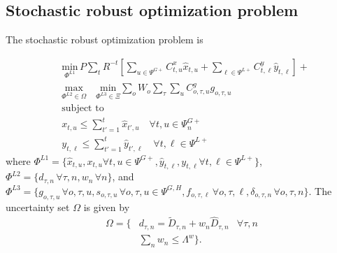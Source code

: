 \documentclass[final]{IEEEtran}
\begin{document}
\subsection{Stochastic robust optimization problem}

The stochastic robust optimization problem is

\begin{align}
&\label{saro_obj} \underset{\Phi^{L1}}{\text{min}} \, P \sum\limits_{t} R^{-t} \left[ \sum\limits_{u \in \Psi^{G+}} C^x_{t, u} \hat{x}_{t, u} + \sum\limits_{\ell \in \Psi^{L+}} C^y_{t, \ell} \hat{y}_{t, \ell} \right] +  \\
&\underset{\Phi^{L2} \in \Omega}{\text{max}} \quad \underset{\Phi^{L3} \in \Xi}{\text{min}} \sum\limits_o W_o \sum\limits_{\tau} \sum\limits_{u} C^g_{o, \tau, u} g_{o, \tau, u} \\
&\text{subject to} \nonumber \\
&\label{master_constraint_first} x_{t, u} \leq \sum\limits_{t' = 1}^{t} \hat{x}_{t', u} 	\quad \forall t, u \in \Psi_n^{G+} \\
&\label{master_constraint_last} y_{t, \ell} \leq \sum\limits_{t' = 1}^{t} \hat{y}_{t', \ell} 	\quad \forall t, \ell \in \Psi^{L+}
\end{align}
where $\Phi^{L1} = \{ \hat{x}_{t, u}, x_{t, u} \forall t, u \in \Psi^{G+}, \hat{y}_{t, \ell}, y_{t, \ell} \forall t, \ell \in \Psi^{L+} \}$, $\Phi^{L2} = \{ d_{\tau, n} \, \forall \tau, n, w_{n} \, \forall n \}$, and $\Phi^{L3} = \{ g_{o, \tau, u} \, \forall o, \tau, u, s_{o, \tau, u} \, \forall o, \tau, u \in \Psi^{G, H}, f_{o, \tau, \ell} \, \forall o, \tau, \ell, \delta_{o, \tau, n} \, \forall o, \tau, n \}$. The uncertainty set $\Omega$ is given by
\begin{align}
\Omega = \{ &d_{\tau, n} = \tilde{D}_{\tau, n} + w_n \hat{D}_{\tau, n} & \forall \tau, n \nonumber \\
&\label{uncertainty_set}\sum\limits_n w_{n} \leq \Lambda^w \}.
\end{align}
\end{document}
